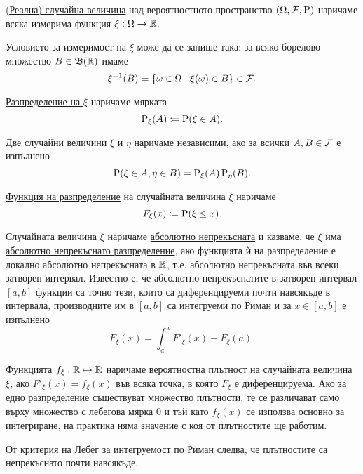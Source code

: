 \documentclass[numbers=endperiod, DIV=15, bibliography=totocnumbered]{scrartcl}
\begin{document}
\begin{definition}
  \uline{(Реална) случайна величина} над вероятностното пространство $(\Omega, \mathcal{F}, \operatorname{P})$ наричаме всяка измерима функция $\xi : \Omega \to \mathbb{R}$.

  Условието за измеримост на $\xi$ може да се запише така: за всяко борелово множество $B \in \mathfrak{B}(\mathbb{R})$ имаме
  \begin{displaymath}
    \xi^{-1} (B) = \{ \omega \in \Omega \mid \xi(\omega) \in B \} \in \mathcal{F}.
  \end{displaymath}

  \uline{Разпределение на $\xi$} наричаме мярката
  \begin{displaymath}
    \operatorname{P}_\xi(A) \coloneqq \operatorname{P}(\xi \in A).
  \end{displaymath}

  Две случайни величини $\xi$ и $\eta$ наричаме \uline{независими}, ако за всички $A, B \in \mathcal{F}$ е изпълнено
  \begin{displaymath}
    \operatorname{P}(\xi \in A, \eta \in B) = \operatorname{P}_\xi(A) \operatorname{P}_\eta(B).
  \end{displaymath}

  \uline{Функция на разпределение} на случайната величина $\xi$ наричаме
  \begin{displaymath}
    F_\xi(x) \coloneqq \operatorname{P}(\xi \leq x).
  \end{displaymath}

  Случайната величина $\xi$ наричаме \uline{абсолютно непрекъсната} и казваме, че $\xi$ има \uline{абсолютно непрекъснато разпределение}, ако функцията ѝ на разпределение е локално абсолютно непрекъсната в $\mathbb{R}$, т.е. абсолютно непрекъсната във всеки затворен интервал. Известно е, че абсолютно непрекъснатите в затворен интервал $[a, b]$ функции са точно тези, които са диференцируеми почти навсякъде в интервала, производните им в $[a, b]$ са интегруеми по Риман и за $x \in [a, b]$ е изпълнено
  \begin{displaymath}
    F_\xi(x) = \int_a^x F'_\xi(x) + F_\xi(a).
  \end{displaymath}

  Функцията $f_\xi: \mathbb{R} \mapsto \mathbb{R}$ наричаме \uline{вероятностна плътност} на случайната величина $\xi$, ако $F'_\xi(x) = f_\xi(x)$ във всяка точка, в която $F_\xi$ е диференцируема. Ако за едно разпределение съществуват множество плътности, те се различават само върху множество с лебегова мярка 0 и тъй като $f_\xi(x)$ се използва основно за интегриране, на практика няма значение с коя от плътностите ще работим.

  От критерия на Лебег за интегруемост по Риман следва, че плътностите са непрекъснато почти навсякъде.
\end{definition}
\end{document}
